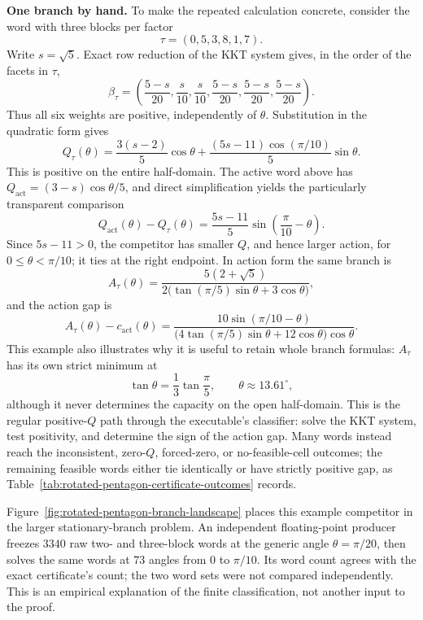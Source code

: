\par\medskip\noindent\textbf{One branch by hand.}
To make the repeated calculation concrete, consider the word with three
blocks per factor
\[
  \tau=(0,5,3,8,1,7).
\]
Write \(s=\sqrt5\).  Exact row reduction of the KKT system gives, in the order
of the facets in \(\tau\),
\[
  \beta_\tau=
  \left(
    \frac{5-s}{20},\frac{s}{10},\frac{s}{10},
    \frac{5-s}{20},\frac{5-s}{20},\frac{5-s}{20}
  \right).
\]
Thus all six weights are positive, independently of \(\theta\).  Substitution
in the quadratic form gives
\[
  Q_\tau(\theta)
  =\frac{3(s-2)}5\cos\theta
   +\frac{(5s-11)\cos(\pi/10)}5\sin\theta.
\]
This is positive on the entire half-domain.  The active word above has
\(Q_{\mathrm{act}}=(3-s)\cos\theta/5\), and direct simplification yields the
particularly transparent comparison
\begin{equation}
\label{eq:rotated-pentagon-worked-q-gap}
  Q_{\mathrm{act}}(\theta)-Q_\tau(\theta)
  =\frac{5s-11}{5}\sin\!\left(\frac{\pi}{10}-\theta\right).
\end{equation}
Since \(5s-11>0\), the competitor has smaller \(Q\), and hence larger action,
for \(0\le\theta<\pi/10\); it ties at the right endpoint.  In action form the
same branch is
\begin{equation}
\label{eq:rotated-pentagon-worked-action}
  A_\tau(\theta)
  =\frac{5(2+\sqrt5)}
  {2\bigl(\tan(\pi/5)\sin\theta+3\cos\theta\bigr)},
\end{equation}
and the action gap is
\[
  A_\tau(\theta)-c_{\mathrm{act}}(\theta)
  =\frac{10\sin(\pi/10-\theta)}
  {\bigl(4\tan(\pi/5)\sin\theta+12\cos\theta\bigr)\cos\theta}.
\]
This example also illustrates why it is useful to retain whole branch
formulas: \(A_\tau\) has its own strict minimum at
\[
  \tan\theta=\frac13\tan\frac\pi5,
  \qquad \theta\approx13.61^\circ,
\]
although it never determines the capacity on the open half-domain.  This is the
regular positive-\(Q\) path through the executable's classifier: solve the KKT
system, test positivity, and determine the sign of the action gap.  Many words
instead reach the inconsistent, zero-\(Q\), forced-zero, or no-feasible-cell
outcomes; the remaining feasible words either tie identically or have strictly
positive gap, as Table~\ref{tab:rotated-pentagon-certificate-outcomes} records.

Figure~\ref{fig:rotated-pentagon-branch-landscape} places this example
competitor in
the larger stationary-branch problem.  An independent floating-point producer
freezes \(3340\) raw two- and three-block words at the generic angle
\(\theta=\pi/20\), then solves the same words at \(73\) angles from \(0\) to
\(\pi/10\).  Its word count agrees with the exact certificate's count; the two
word sets were not compared independently.  This is an empirical explanation
of the finite classification, not another input to the proof.

